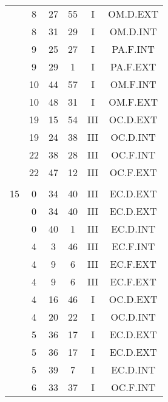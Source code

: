 \documentclass[12pt, a4paper]{article}
\begin{document}
\begin{multicols}{3}
{\begin{tabular}{c c c c c c}
	 	 	 	 & 8 & 27 & 55 & I & OM.D.EXT\\%
	 	 	 	 & 8 & 31 & 29 & I & OM.D.INT\\%
	 	 	 	 & 9 & 25 & 27 & I & PA.F.INT\\%
	 	 	 	 & 9 & 29 & 1 & I & PA.F.EXT\\%
	 	 	 	 & 10 & 44 & 57 & I & OM.F.INT\\%
	 	 	 	 & 10 & 48 & 31 & I & OM.F.EXT\\%
	 	 	 	 & 19 & 15 & 54 & III & OC.D.EXT\\%
	 	 	 	 & 19 & 24 & 38 & III & OC.D.INT\\%
	 	 	 	 & 22 & 38 & 28 & III & OC.F.INT\\%
	 	 	 	 & 22 & 47 & 12 & III & OC.F.EXT\\%
	 	 	 	 & & & & & \\%
	 	 	 	15 & 0 & 34 & 40 & III & EC.D.EXT\\%
	 	 	 	 & 0 & 34 & 40 & III & EC.D.EXT\\%
	 	 	 	 & 0 & 40 & 1 & III & EC.D.INT\\%
	 	 	 	 & 4 & 3 & 46 & III & EC.F.INT\\%
	 	 	 	 & 4 & 9 & 6 & III & EC.F.EXT\\%
	 	 	 	 & 4 & 9 & 6 & III & EC.F.EXT\\%
	 	 	 	 & 4 & 16 & 46 & I & OC.D.EXT\\%
	 	 	 	 & 4 & 20 & 22 & I & OC.D.INT\\%
	 	 	 	 & 5 & 36 & 17 & I & EC.D.EXT\\%
	 	 	 	 & 5 & 36 & 17 & I & EC.D.EXT\\%
	 	 	 	 & 5 & 39 & 7 & I & EC.D.INT\\%
	 	 	 	 & 6 & 33 & 37 & I & OC.F.INT\\%

\end{tabular}}
\end{multicols}
\end{document}
